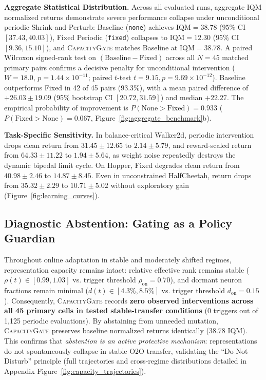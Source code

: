 \documentclass{article}
\begin{document}
\textbf{Aggregate Statistical Distribution.} Across all evaluated runs, aggregate IQM normalized returns demonstrate severe performance collapse under unconditional periodic Shrink-and-Perturb: Baseline (\texttt{none}) achieves $\mathrm{IQM} = 38.78$ ($95\%$ CI $[37.43, 40.03]$), Fixed Periodic (\texttt{fixed}) collapses to $\mathrm{IQM} = 12.30$ ($95\%$ CI $[9.36, 15.10]$), and \textsc{CapacityGate} matches Baseline at $\mathrm{IQM} = 38.78$. A paired Wilcoxon signed-rank test on $(\text{Baseline} - \text{Fixed})$ across all $N=45$ matched primary pairs confirms a decisive penalty for unconditional intervention ($W = 18.0$, $p = 1.44 \times 10^{-11}$; paired $t$-test $t = 9.15, p = 9.69 \times 10^{-12}$). Baseline outperforms Fixed in 42 of 45 pairs (93.3\%), with a mean paired difference of $+26.03 \pm 19.09$ (95\% bootstrap CI $[20.72, 31.59]$) and median $+22.27$. The empirical probability of improvement is $P(\text{None} > \text{Fixed}) = 0.933$ ($P(\text{Fixed} > \text{None}) = 0.067$, Figure~\ref{fig:aggregate_benchmark}b).

\textbf{Task-Specific Sensitivity.} In balance-critical Walker2d, periodic intervention drops clean return from $31.45 \pm 12.65$ to $2.14 \pm 5.79$, and reward-scaled return from $64.33 \pm 11.22$ to $1.94 \pm 5.64$, as weight noise repeatedly destroys the dynamic bipedal limit cycle. On Hopper, Fixed degrades clean return from $40.98 \pm 2.46$ to $14.87 \pm 8.45$. Even in unconstrained HalfCheetah, return drops from $35.32 \pm 2.29$ to $10.71 \pm 5.02$ without exploratory gain (Figure~\ref{fig:learning_curves}).

\subsection{Diagnostic Abstention: Gating as a Policy Guardian}
\label{sec:abstention}

Throughout online adaptation in stable and moderately shifted regimes, representation capacity remains intact: relative effective rank remains stable ($\rho(t) \in [0.99, 1.03]$ vs. trigger threshold $\rho_{\mathrm{on}} = 0.70$), and dormant neuron fractions remain minimal ($d(t) \in [4.3\%, 8.5\%]$ vs. trigger threshold $d_{\mathrm{on}} = 0.15$). Consequently, \textsc{CapacityGate} records \textbf{zero observed interventions across all 45 primary cells in tested stable-transfer conditions} (0 triggers out of 1,125 periodic evaluations). By abstaining from unneeded mutation, \textsc{CapacityGate} preserves baseline normalized returns identically ($38.78$ IQM). This confirms that \emph{abstention is an active protective mechanism}: representations do not spontaneously collapse in stable O2O transfer, validating the ``Do Not Disturb'' principle (full trajectories and cross-regime distributions detailed in Appendix Figure~\ref{fig:capacity_trajectories}).
\end{document}

